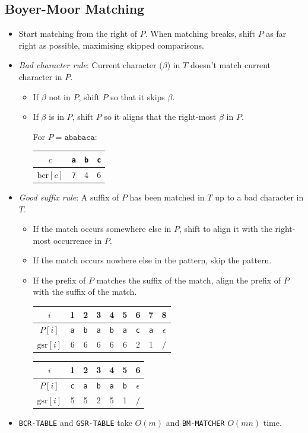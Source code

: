 \documentclass[twocolumn,english]{article}
\providecommand{\tabularnewline}{\\}
\numberwithin{equation}{section}
\numberwithin{figure}{section}
\numberwithin{table}{section}
\providecommand{\tabularnewline}{\\}
\begin{document}
\subsection{Boyer-Moor Matching}
\begin{itemize}
\item Start matching from the right of $P$. When matching breaks, shift
$P$ as far right as possible, maximising skipped comparisons.
\item \emph{Bad character rule}: Current character ($\beta$) in $T$ doesn't
match current character in $P$.
\begin{itemize}
\item If $\beta$ not in $P$, shift $P$ so that it skips $\beta$.
\item If $\beta$ is in $P$, shift $P$ so it aligns that the right-most
$\beta$ in $P$.
\begin{table}[H]
\centering{}For $P=\texttt{ababaca}$: %
\begin{tabular}{cccc}
\toprule 
$c$ & \texttt{a} & \texttt{b} & \texttt{c}\tabularnewline
\midrule
$\text{bcr}\left[c\right]$ & \texttt{7} & 4 & 6\tabularnewline
\bottomrule
\end{tabular}
\end{table}
\end{itemize}
\item \emph{Good suffix rule}: A suffix of $P$ has been matched in $T$
up to a bad character in $T$.
\begin{itemize}
\item If the match occurs somewhere else in $P$, shift to align it with
the right-most occurrence in $P$.
\item If the match occurs nowhere else in the pattern, skip the pattern.
\item If the prefix of $P$ matches the suffix of the match, align the prefix
of $P$ with the suffix of the match.
\begin{table}[H]
\centering{}%
\begin{tabular}{ccccccccc}
\toprule 
$i$ & 1 & 2 & 3 & 4 & 5 & 6 & 7 & 8\tabularnewline
\midrule
$P\left[i\right]$ & \texttt{a} & \texttt{b} & \texttt{a} & \texttt{b} & \texttt{a} & \texttt{c} & \texttt{a} & $\epsilon$\tabularnewline
$\text{gsr}\left[i\right]$ & 6 & 6 & 6 & 6 & 6 & 2 & 1 & $\slash$\tabularnewline
\bottomrule
\end{tabular}
\end{table}
\begin{table}[H]
\centering{}%
\begin{tabular}{ccccccc}
\toprule 
$i$ & 1 & 2 & 3 & 4 & 5 & 6\tabularnewline
\midrule
$P\left[i\right]$ & \texttt{c} & \texttt{a} & \texttt{b} & \texttt{a} & \texttt{b} & $\epsilon$\tabularnewline
$\text{gsr}\left[i\right]$ & 5 & 5 & 2 & 5 & 1 & $\slash$\tabularnewline
\bottomrule
\end{tabular}
\end{table}
\end{itemize}
\item \texttt{BCR-TABLE} and \texttt{GSR-TABLE} take $O\left(m\right)$
and \texttt{BM-MATCHER} $O\left(mn\right)$ time.
\end{itemize}
\end{document}
